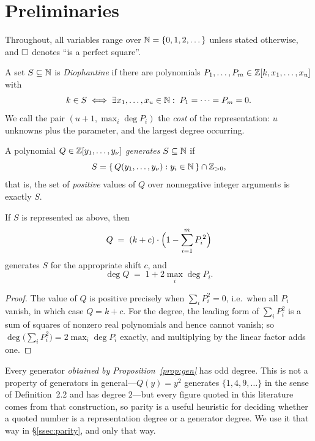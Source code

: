\section{Preliminaries}
\label{sec:prelim}

Throughout, all variables range over $\mathbb{N}=\{0,1,2,\dots\}$ unless stated
otherwise, and $\square$ denotes ``is a perfect square''.

\begin{definition}[Representation]
A set $S\subseteq\mathbb{N}$ is \emph{Diophantine} if there are polynomials
$P_1,\dots,P_m\in\mathbb{Z}[k,x_1,\dots,x_u]$ with
\[
  k\in S \iff \exists x_1,\dots,x_u\in\mathbb{N}:\; P_1=\dots=P_m=0 .
\]
We call the pair $(u+1,\max_i\deg P_i)$ the \emph{cost} of the representation:
$u$ unknowns plus the parameter, and the largest degree occurring.
\end{definition}

\begin{definition}[Generator]
A polynomial $Q\in\mathbb{Z}[y_1,\dots,y_\nu]$ \emph{generates} $S\subseteq\mathbb{N}$ if
\[
  S=\{\,Q(y_1,\dots,y_\nu) : y_i\in\mathbb{N} \,\}\cap\mathbb{Z}_{>0},
\]
that is, the set of \emph{positive} values of $Q$ over nonnegative integer
arguments is exactly $S$.
\end{definition}

\begin{proposition}
\label{prop:gen}
If $S$ is represented as above, then
\[
  Q \;=\; (k+c)\cdot\Bigl(1-\sum_{i=1}^m P_i^{\,2}\Bigr)
\]
generates $S$ for the appropriate shift $c$, and
\[
  \deg Q \;=\; 1+2\max_i \deg P_i .
\]
\end{proposition}

\begin{proof}
The value of $Q$ is positive precisely when $\sum_i P_i^2=0$, i.e.\ when all
$P_i$ vanish, in which case $Q=k+c$. For the degree, the leading form of
$\sum_i P_i^2$ is a sum of squares of nonzero real polynomials and hence cannot
vanish; so $\deg\bigl(\sum_i P_i^2\bigr)=2\max_i\deg P_i$ exactly, and
multiplying by the linear factor adds one.
\end{proof}

\begin{remark}
\label{rem:odd}
Every generator \emph{obtained by Proposition~\ref{prop:gen}} has odd degree.
This is not a property of generators in general---$Q(y)=y^2$ generates
$\{1,4,9,\dots\}$ in the sense of Definition~2.2 and has degree $2$---but every
figure quoted in this literature comes from that construction, so parity is a
useful heuristic for deciding whether a quoted number is a representation degree
or a generator degree. We use it that way in \S\ref{ssec:parity}, and only that
way.
\end{remark}


